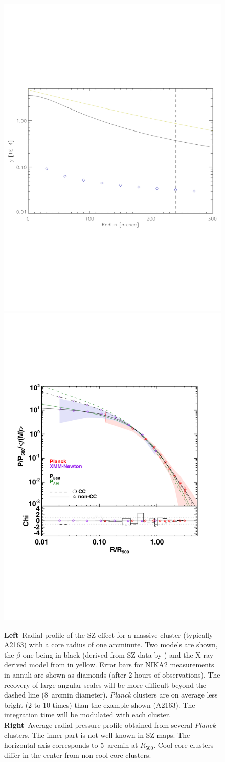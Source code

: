 \documentclass[10pt,a4paper,twoside,graphicx,color]{article}
\begin{document}
\begin{figure}
  \begin{center}
   \includegraphics[width=0.45\columnwidth]{./Figures/Arsenal_SZprofile.pdf}
   \includegraphics[width=0.45\columnwidth]{./Figures/PressureProfilePlanckXMM.pdf}
  \end{center}
  \caption{{\bf Left}~Radial profile of the SZ effect for a massive
    cluster (typically A2163) with a core radius of one arcminute. Two
    models are shown, the $\beta$ one being in black (derived from SZ
    data by \cite{Reese2002}) and the X-ray derived model from
    \cite{Arnaud2010} in yellow. Error bars for NIKA2 measurements in
    annuli are shown as diamonds (after 2 hours of observations). The
    recovery of large angular scales will be more difficult beyond the
    dashed line (8~arcmin diameter). {\sl Planck} clusters are on
    average less bright (2 to 10 times) than the example shown
    (A2163). The integration time will be modulated with each
    cluster. {\bf Right}~Average radial pressure profile obtained from
    several {\sl Planck} clusters. The inner part is not well-known in
    SZ maps. The horizontal axis corresponds to 5~arcmin at
    $R_{500}$. Cool core clusters differ in the center from
    non-cool-core clusters.}
  
\label{Fig:SZprofile}
\end{figure}
   
\end{document}
